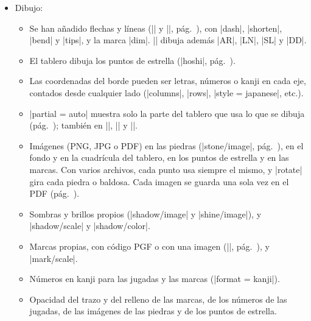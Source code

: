 \begin{itemize}
\begin{itemize}
\begin{itemize}
					\item |last mark| marca la última jugada, y |to = last| llega hasta el final.
					\item Se ha añadido |\sgfproblem|, que dibuja un problema (tsumego): el enunciado y un diagrama por cada variante de la solución, con sus comentarios (pág.~\pageref{subsec:sgfproblemas}). Con |game = 1:20|, una hoja de problemas de una colección; con |verdict|, el epígrafe dice si la variante es correcta.
					\item Con el paquete |animate|, |\sgfanimation| permite recorrer una partida con botones (pág.~\pageref{subsec:sgfanimacion}). Arma la animación por capas (|layers|): cada piedra se dibuja una sola vez, y el PDF de una partida larga ocupa mucho menos.
				\end{itemize}
			\item Dibujo:
				\begin{itemize}
					\item Se han añadido flechas y líneas (|\arrow| y |\line|, pág.~\pageref{subsec:flechas}), con |dash|, |shorten|, |bend| y |tips|, y la marca |dim|. |\sgf| dibuja además |AR|, |LN|, |SL| y |DD|.
					\item El tablero dibuja los puntos de estrella (|hoshi|, pág.~\pageref{subsec:hoshi}).
					\item Las coordenadas del borde pueden ser letras, números o kanji en cada eje, contados desde cualquier lado (|columns|, |rows|, |style = japanese|, etc.).
					\item |partial = auto| muestra solo la parte del tablero que usa lo que se dibuja (pág.~\pageref{subsec:parcial}); también en |\sgfdiagrams|, |\sgfanimation| y |\sgfproblem|.
					\item Imágenes (PNG, JPG o PDF) en las piedras (|stone/image|, pág.~\pageref{subsec:piedrasimagen}), en el fondo y en la cuadrícula del tablero, en los puntos de estrella y en las marcas. Con varios archivos, cada punto usa siempre el mismo, y |rotate| gira cada piedra o baldosa. Cada imagen se guarda una sola vez en el PDF (pág.~\pageref{subsubsec:imagenespdf}).
					\item Sombras y brillos propios (|shadow/image| y |shine/image|), y |shadow/scale| y |shadow/color|.
					\item Marcas propias, con código PGF o con una imagen (|\pgfgodefinemark|, pág.~\pageref{subsec:marcaspropias}), y |mark/scale|.
					\item Números en kanji para las jugadas y las marcas (|format = kanji|).
					\item Opacidad del trazo y del relleno de las marcas, de los números de las jugadas, de las imágenes de las piedras y de los puntos de estrella.

\end{itemize}
\end{itemize}
\end{itemize}
